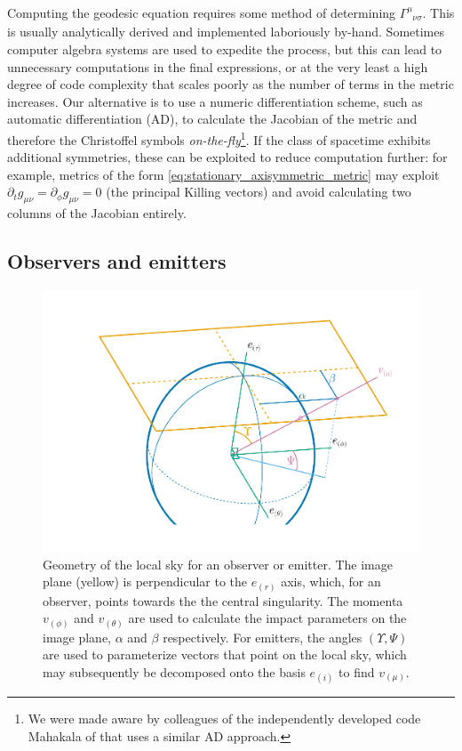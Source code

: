 \documentclass[fleqn,usenatbib]{mnras}
\newcommand{\utensor}[3]{#1^{#2}_{\phantom{#2}#3}}
\begin{document}
Computing the geodesic equation requires some method of determining
$\utensor{\Gamma}{\mu}{\nu\sigma}$. This is usually analytically derived and
implemented laboriously by-hand. Sometimes computer algebra systems are used to
expedite the process, but this can lead to unnecessary computations in the final
expressions, or at the very least a high degree of code complexity that scales
poorly as the number of terms in the metric increases. Our alternative is to use
a numeric differentiation scheme, such as automatic differentiation (AD), to
calculate the Jacobian of the metric and therefore the Christoffel symbols
\emph{on-the-fly}\footnote{We were made
    aware by colleagues of the independently developed code Mahakala of
\citet{sharma_mahakala_2023} that uses a similar AD approach.}. If the
class of spacetime exhibits additional symmetries, these can be exploited to
reduce computation further: for example, metrics of the form
\eqref{eq:stationary_axisymmetric_metric} may exploit $\partial_t g_{\mu\nu} =
\partial_{\phi} g_{\mu\nu} = 0$ (the principal Killing vectors) and avoid
calculating two columns of the Jacobian entirely.

\subsection{Observers and emitters}
\label{sec:observers-and-emitters}

\begin{figure}
    \centering
    \includegraphics[width=0.99\columnwidth]{figures/skycoords.pdf}
    \caption{
    Geometry of the local sky for an observer or emitter. The image plane
    (yellow) is perpendicular to the $e_{(r)}$ axis, which, for an observer,
    points towards the the central singularity. The momenta $v_{(\phi)}$ and
    $v_{(\theta)}$ are used to calculate the impact parameters on the image
    plane, $\alpha$ and $\beta$ respectively. For emitters, the angles
    $(\Upsilon, \Psi)$ are used to parameterize vectors that point on the local
    sky, which may subsequently be decomposed onto the basis $e_{(i)}$ to find
    $v_{(\mu)}$.
    }
    \label{fig:observer-coordinates}
\end{figure}
\end{document}
